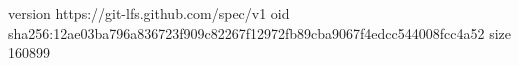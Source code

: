 version https://git-lfs.github.com/spec/v1
oid sha256:12ae03ba796a836723f909c82267f12972fb89cba9067f4edcc544008fcc4a52
size 160899
